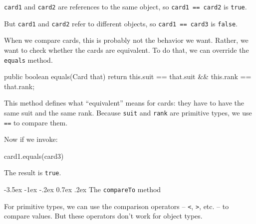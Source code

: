 \documentclass[12pt]{book}
\makeatletter
\theoremstyle{exercise}
\newcommand{\java}[1]{\verb"#1"}
\renewcommand{\section}{\@startsection{section}{1}{\z@}%
    {-3.5ex \@plus -1ex \@minus -.2ex}%
    {0.7ex \@plus.2ex}%
    {\normalfont\Large\bfseries}}
\newcommand{\java}[1]{\lstinline{#1}} %
\makeatother
\begin{document}
\java{card1} and \java{card2} are references to the same object, so \java{card1 == card2} is \java{true}.

But \java{card1} and \java{card2} refer to different objects, so \java{card1 == card3} is \java{false}.

When we compare cards, this is probably not the behavior we want.
Rather, we want to check whether the cards are equivalent.
To do that, we can override the \java{equals} method.


\begin{code}
    public boolean equals(Card that) {
        return this.suit == that.suit && this.rank == that.rank;
    }
\end{code}

This method defines what ``equivalent'' means for cards: they have to have the same suit and the same rank.
Because \java{suit} and \java{rank} are primitive types, we use \java{==} to compare them.

Now if we invoke:

\begin{code}
  card1.equals(card3)
\end{code}

The result is \java{true}.






\section{The \java{compareTo} method}
\label{compare}


For primitive types, we can use the comparison operators -- \java{<}, \java{>}, etc. -- to compare values.
But these operators don't work for object types.
\end{document}
